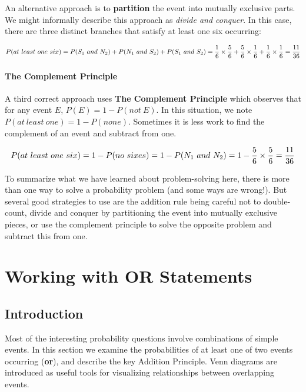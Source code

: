 \documentclass[]{book}
\theoremstyle{definition}
\theoremstyle{definition}
\theoremstyle{definition}
\theoremstyle{remark}
\begin{document}
An alternative approach is to \textbf{partition} the event into mutually
exclusive parts. We might informally describe this approach as
\emph{divide and conquer}. In this case, there are three distinct
branches that satisfy at least one six occurring:

\[P(at\ least\ one\ six) = P(S_{1}\ and\ N_{2}) + P(N_{1}\ and\ S_{2}) + P(S_{1}\ and\ S_{2}) = \\  \frac{1}{6} \times \frac{5}{6} + \frac{5}{6} \times \frac{1}{6} + \frac{1}{6} \times \frac{1}{6} = \frac{11}{36}\]

\subsubsection{The Complement Principle}\label{the-complement-principle}

A third correct approach uses \textbf{The Complement Principle} which
observes that for any event \(E\), \(P(E) = 1 - P(not\ E)\). In this
situation, we note \(P(at\ least\ one) = 1 - P(none)\). Sometimes it is
less work to find the complement of an event and subtract from one.

\[P(at\ least\ one\ six) = 1 - P(no\ sixes) = 1 - P(N_{1}\ and\ N_{2}) = \\  1 - \frac{5}{6} \times \frac{5}{6} = \frac{11}{36}\]

To summarize what we have learned about problem-solving here, there is
more than one way to solve a probability problem (and some ways are
wrong!). But several good strategies to use are the addition rule being
careful not to double-count, divide and conquer by partitioning the
event into mutually exclusive pieces, or use the complement principle to
solve the opposite problem and subtract this from one.

\chapter{Working with OR Statements}\label{working_with_or_statements}

\section{Introduction}\label{introduction}

Most of the interesting probability questions involve combinations of
simple events. In this section we examine the probabilities of at least
one of two events occurring (\textbf{or}), and describe the key Addition
Principle. Venn diagrams are introduced as useful tools for visualizing
relationships between overlapping events.
\end{document}
